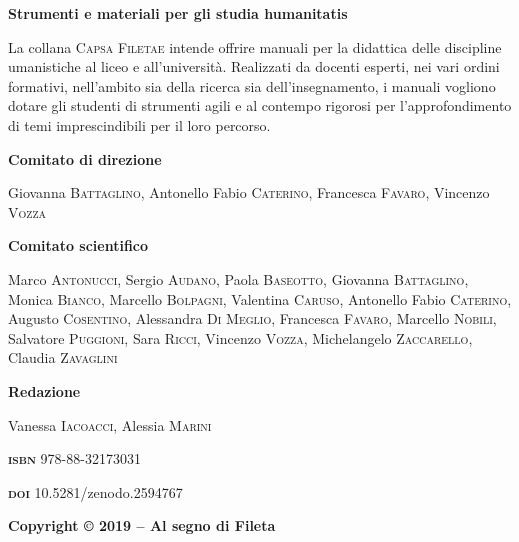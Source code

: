 \documentclass[
  b5paper,
  twoside,
  12pt,
  chapterprefix=false,
  bibliography=totocnumbered,
  parskip=false]{scrbook}
\begin{document}
\makeatother
\nopagecolor%
\pagecolor{white}

\thispagestyle{empty}

\setlength{\parindent}{0pt}
\textbf{Strumenti e materiali per gli studia humanitatis}

La collana \textsc{Capsa Filetae} intende offrire manuali per la
didattica delle discipline umanistiche al liceo e all'università.
Realizzati da docenti esperti, nei vari ordini formativi, nell'ambito
sia della ricerca sia dell'insegnamento, i manuali vogliono dotare gli
studenti di strumenti agili e al contempo rigorosi per l'approfondimento
di temi imprescindibili per il loro percorso.

\vspace{2em}

\textbf{Comitato di direzione}

Giovanna \textsc{Battaglino}, Antonello Fabio \textsc{Caterino}, 
Francesca \textsc{Favaro}, Vincenzo \textsc{Vozza}

\vspace{2em}

\textbf{Comitato scientifico}

Marco \textsc{Antonucci}, Sergio \textsc{Audano,} Paola
\textsc{Baseotto}, Giovanna \textsc{Battaglino}, Monica \textsc{Bianco},
Marcello \textsc{Bolpagni}, Valentina \textsc{Caruso}, Antonello Fabio 
\textsc{Caterino}, Augusto \textsc{Cosentino}, Alessandra \textsc{Di}
\textsc{Meglio}, Francesca \textsc{Favaro}, Marcello \textsc{Nobili},
Salvatore \textsc{Puggioni}, Sara \textsc{Ricci}, Vincenzo
\textsc{Vozza}, Michelangelo \textsc{Zaccarello}, Claudia
\textsc{Zavaglini}


\vspace{2em}

\textbf{Redazione}

Vanessa \textsc{Iacoacci}, Alessia \textsc{Marini}


\vspace{2em}

\textbf{\textsc{isbn}} 978-88-32173031

\textbf{\textsc{doi}} 10.5281/zenodo.2594767

\vspace{1em}
\textbf{Copyright © 2019 -- Al segno di Fileta}

\setlength{\parindent}{1em}
\end{document}
